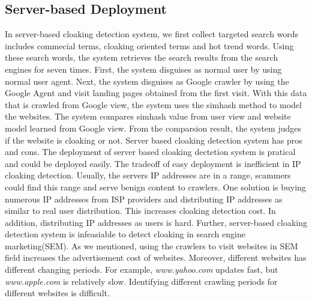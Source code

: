\subsection{Server-based Deployment}
In server-based cloaking detection system,
we first collect targeted search words includes commecial terms, cloaking oriented terms and hot trend words.
Using these search words, the system retrieves the search results from the search engines for seven times.
First, the system disguises as normal user by using normal user agent. Next, the
system disguises as Google crawler by using the Google Agent and visit landing
pages obtained from the first visit. With this data that
is crawled from Google view, the system uses the simhash method to model the websites.  
The system compares simhash value from user view and
website model learned from Google view. From the comparsion result, the system judges if the website is cloaking
or not. 
Server based cloaking detection system has pros and cons. The deployment of server based cloaking dectetion system
is pratical and could be deployed
easily. The tradeoff of easy deployment is inefficient in IP cloaking detection. Usually, the servers IP addresses
are in a range,  scammers could find this range and serve benign content to crawlers. One solution is buying numerous IP addresses
from ISP providers and distributing IP addresses as similar to real user distribution. This increases cloaking detection cost. In
addition, distributing IP addresses as users is hard. Further, server-based cloaking detection system is infeasiable
to detect cloaking in search engine marketing(SEM). As we mentioned, using the crawlers to visit websites in SEM field
increases the advertisement cost of websites. Moreover, different websites has
different changing periods. For example, {\it www.yahoo.com} 
updates fast, but {\it www.apple.com} is relatively slow. Identifying different 
crawling periods for different websites is difficult. 

